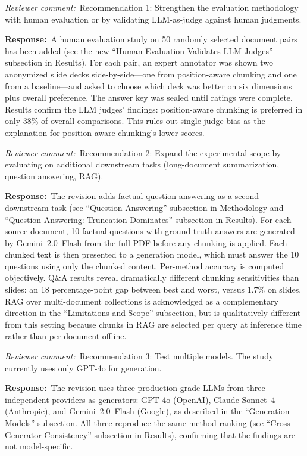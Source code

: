 \documentclass[11pt]{article}
\newcommand{\rcomment}[1]{\noindent\textcolor{revcomment}{\textit{Reviewer comment:}}~#1\par\medskip}
\newcommand{\rresponse}[1]{\noindent\textcolor{response}{\textbf{Response:}}~#1\par\medskip\medskip}
\begin{document}
\rcomment{Recommendation 1: Strengthen the evaluation methodology with human evaluation or by validating LLM-as-judge against human judgments.}

\rresponse{A human evaluation study on 50 randomly selected document pairs has been added (see the new ``Human Evaluation Validates LLM Judges'' subsection in Results). For each pair, an expert annotator was shown two anonymized slide decks side-by-side---one from position-aware chunking and one from a baseline---and asked to choose which deck was better on six dimensions plus overall preference. The answer key was sealed until ratings were complete. Results confirm the LLM judges' findings: position-aware chunking is preferred in only 38\% of overall comparisons. This rules out single-judge bias as the explanation for position-aware chunking's lower scores.}

\rcomment{Recommendation 2: Expand the experimental scope by evaluating on additional downstream tasks (long-document summarization, question answering, RAG).}

\rresponse{The revision adds factual question answering as a second downstream task (see ``Question Answering'' subsection in Methodology and ``Question Answering: Truncation Dominates'' subsection in Results). For each source document, 10 factual questions with ground-truth answers are generated by Gemini~2.0~Flash from the full PDF before any chunking is applied. Each chunked text is then presented to a generation model, which must answer the 10 questions using only the chunked content. Per-method accuracy is computed objectively. Q\&A results reveal dramatically different chunking sensitivities than slides: an 18 percentage-point gap between best and worst, versus 1.7\% on slides. RAG over multi-document collections is acknowledged as a complementary direction in the ``Limitations and Scope'' subsection, but is qualitatively different from this setting because chunks in RAG are selected per query at inference time rather than per document offline.}

\rcomment{Recommendation 3: Test multiple models. The study currently uses only GPT-4o for generation.}

\rresponse{The revision uses three production-grade LLMs from three independent providers as generators: GPT-4o (OpenAI), Claude Sonnet~4 (Anthropic), and Gemini~2.0~Flash (Google), as described in the ``Generation Models'' subsection. All three reproduce the same method ranking (see ``Cross-Generator Consistency'' subsection in Results), confirming that the findings are not model-specific.}
\end{document}
